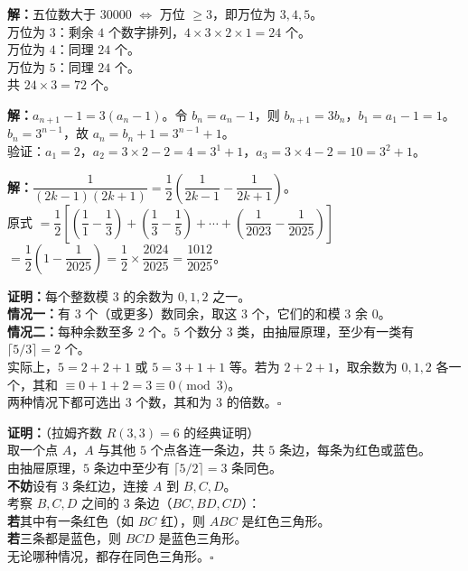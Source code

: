 \documentclass[12pt, a4paper]{ctexart}
\begin{document}
\begin{knowledgebox}[第5题]
\textbf{解：}五位数大于 $30000$ $\Leftrightarrow$ 万位 $\geqslant 3$，即万位为 $3,4,5$。\\[4pt]
万位为 $3$：剩余 $4$ 个数字排列，$4\times 3\times 2\times 1=24$ 个。\\
万位为 $4$：同理 $24$ 个。\\
万位为 $5$：同理 $24$ 个。\\[4pt]
共 $24\times 3=\boxed{72}$ 个。
\end{knowledgebox}

\begin{knowledgebox}[第6题]
\textbf{解：}$a_{n+1}-1=3(a_n-1)$。令 $b_n=a_n-1$，则 $b_{n+1}=3b_n$，$b_1=a_1-1=1$。\\
$b_n=3^{n-1}$，故 $a_n=b_n+1=\boxed{3^{n-1}+1}$。\\[4pt]
验证：$a_1=2$，$a_2=3\times 2-2=4=3^1+1$，$a_3=3\times 4-2=10=3^2+1$。\checkmark
\end{knowledgebox}

\begin{knowledgebox}[第7题]
\textbf{解：}$\dfrac{1}{(2k-1)(2k+1)}=\dfrac{1}{2}\left(\dfrac{1}{2k-1}-\dfrac{1}{2k+1}\right)$。\\[4pt]
原式 $=\dfrac{1}{2}\left[\left(\dfrac{1}{1}-\dfrac{1}{3}\right)+\left(\dfrac{1}{3}-\dfrac{1}{5}\right)+\cdots+\left(\dfrac{1}{2023}-\dfrac{1}{2025}\right)\right]$\\[4pt]
$=\dfrac{1}{2}\left(1-\dfrac{1}{2025}\right)=\dfrac{1}{2}\times\dfrac{2024}{2025}=\boxed{\dfrac{1012}{2025}}$。
\end{knowledgebox}

\begin{knowledgebox}[第8题]
\textbf{证明：}每个整数模 $3$ 的余数为 $0,1,2$ 之一。\\[4pt]
\textbf{情况一：}有 $3$ 个（或更多）数同余，取这 $3$ 个，它们的和模 $3$ 余 $0$。\\[4pt]
\textbf{情况二：}每种余数至多 $2$ 个。$5$ 个数分 $3$ 类，由抽屉原理，至少有一类有 $\lceil 5/3\rceil=2$ 个。\\
实际上，$5=2+2+1$ 或 $5=3+1+1$ 等。若为 $2+2+1$，取余数为 $0,1,2$ 各一个，其和 $\equiv 0+1+2=3\equiv 0\pmod{3}$。\\[4pt]
两种情况下都可选出 $3$ 个数，其和为 $3$ 的倍数。\hfill$\square$
\end{knowledgebox}

\begin{knowledgebox}[第9题]
\textbf{证明：}（拉姆齐数 $R(3,3)=6$ 的经典证明）\\[4pt]
取一个点 $A$，$A$ 与其他 $5$ 个点各连一条边，共 $5$ 条边，每条为红色或蓝色。\\
由抽屉原理，$5$ 条边中至少有 $\lceil 5/2\rceil=3$ 条同色。\\[4pt]
\textbf{不妨}设有 $3$ 条红边，连接 $A$ 到 $B,C,D$。\\[4pt]
考察 $B,C,D$ 之间的 $3$ 条边（$BC,BD,CD$）：\\
\textbf{若}其中有一条红色（如 $BC$ 红），则 $ABC$ 是红色三角形。\\
\textbf{若}三条都是蓝色，则 $BCD$ 是蓝色三角形。\\[4pt]
无论哪种情况，都存在同色三角形。\hfill$\square$
\end{knowledgebox}
\end{document}
